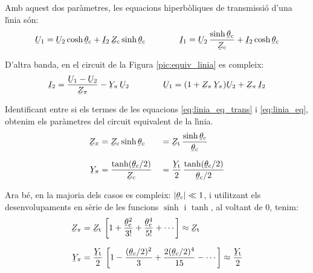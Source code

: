 Amb aquest dos par\`{a}metres, les equacions hiperb\`{o}liques de
transmissi\'{o} d'una l\'{\i}nia s\'{o}n: 
\begin{equation}\label{eq:linia_eq_trans}
   \cmplx{U}_1 = \cmplx{U}_2 \cosh \cmplx{\theta}\ped{c}  + \cmplx{I}_2 \,\cmplx{Z}\ped{c} \sinh \cmplx{\theta}\ped{c}   \qquad \qquad
   \cmplx{I}_1 = \cmplx{U}_2 \, \frac{\sinh \cmplx{\theta}\ped{c}}{\cmplx{Z}\ped{c}}  +   \cmplx{I}_2 \cosh \cmplx{\theta}\ped{c}
\end{equation}

D'altra banda, en el circuit de la Figura \vref{pic:equiv_linia} es compleix:
\begin{equation}\label{eq:linia_eq}
   \cmplx{I}_2 = \frac{\cmplx{U}_1 - \cmplx{U}_2}{\cmplx{Z}_\pi} - \cmplx{Y}_\pi\, \cmplx{U}_2
   \qquad \qquad
   \cmplx{U}_1 = (1 + \cmplx{Z}_\pi\,\cmplx{Y}_\pi ) \cmplx{U}_2 + \cmplx{Z}_\pi\,\cmplx{I}_2
\end{equation}

Identificant entre si els termes de les equacions
\eqref{eq:linia_eq_trans} i \eqref{eq:linia_eq}, obtenim els
par\`{a}metres del circuit equivalent de la l\'{\i}nia.
\begin{alignat}{2}
   \cmplx{Z}_\pi &= \cmplx{Z}\ped{c} \sinh \cmplx{\theta}\ped{c} &&= \cmplx{Z}\ped{t} \,
   \frac{\sinh \cmplx{\theta}\ped{c}}{\cmplx{\theta}\ped{c}} \\[1.5ex]
   \cmplx{Y}_\pi &= \frac{\tanh (\cmplx{\theta}\ped{c} / 2) }{\cmplx{Z}\ped{c}} &&=
   \frac{\cmplx{Y}\ped{t}}{2} \, \frac{\tanh (\cmplx{\theta}\ped{c} / 2)}{\cmplx{\theta}\ped{c} / 2}
\end{alignat}

Ara b\'{e}, en la majoria dels casos es compleix: $|\cmplx{\theta}\ped{c}| \ll 1$, i utilitzant els desenvolupaments en s\`{e}rie de les funcions $\sinh$ i $\tanh$, al voltant de 0, tenim:
\begin{align}
   \cmplx{Z}_\pi &= \cmplx{Z}\ped{t} \, \left[ 1 + \frac{\cmplx{\theta}\ped{c}^2}{3!} +
   \frac{\cmplx{\theta}\ped{c}^4}{5!} + \cdots \right] \approx \cmplx{Z}\ped{t} \\[1.5ex]
   \cmplx{Y}_\pi &= \frac{\cmplx{Y}\ped{t}}{2} \,\left[ 1 - \frac{(\cmplx{\theta}\ped{c}/2)^2}{3} + \frac{2 (\cmplx{\theta}\ped{c}/2)^4}{15} - \cdots \right] \approx \frac{\cmplx{Y}\ped{t}}{2}
\end{align}

